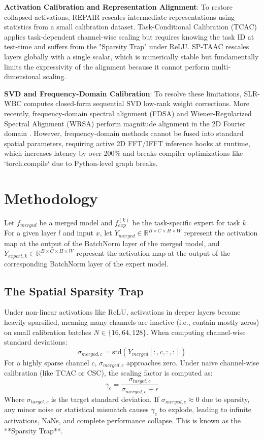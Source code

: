 \documentclass{article}
\theoremstyle{plain}
\theoremstyle{definition}
\theoremstyle{remark}
\begin{document}
\textbf{Activation Calibration and Representation Alignment}: To restore collapsed activations, REPAIR \citep{Jordan2023} rescales intermediate representations using statistics from a small calibration dataset. Task-Conditional Calibration (TCAC) applies task-dependent channel-wise scaling but requires knowing the task ID at test-time and suffers from the "Sparsity Trap" under ReLU. SP-TAAC rescales layers globally with a single scalar, which is numerically stable but fundamentally limits the expressivity of the alignment because it cannot perform multi-dimensional scaling.

\textbf{SVD and Frequency-Domain Calibration}: To resolve these limitations, SLR-WBC \citep{Anonymous2026} computes closed-form sequential SVD low-rank weight corrections. More recently, frequency-domain spectral alignment (FDSA) and Wiener-Regularized Spectral Alignment (WRSA) perform magnitude alignment in the 2D Fourier domain \citep{Anonymous2025}. However, frequency-domain methods cannot be fused into standard spatial parameters, requiring active 2D FFT/IFFT inference hooks at runtime, which increases latency by over 200\% and breaks compiler optimizations like `torch.compile` due to Python-level graph breaks.

\section{Methodology}
\label{sec:method}
Let $f_{merged}$ be a merged model and $f_{exp}^{(k)}$ be the task-specific expert for task $k$. For a given layer $l$ and input $x$, let $Y_{merged} \in \mathbb{R}^{B \times C \times H \times W}$ represent the activation map at the output of the BatchNorm layer of the merged model, and $Y_{expert, k} \in \mathbb{R}^{B \times C \times H \times W}$ represent the activation map at the output of the corresponding BatchNorm layer of the expert model.

\subsection{The Spatial Sparsity Trap}
Under non-linear activations like ReLU, activations in deeper layers become heavily sparsified, meaning many channels are inactive (i.e., contain mostly zeros) on small calibration batches $N \in \{16, 64, 128\}$. When computing channel-wise standard deviations:
\begin{equation}
\sigma_{merged, c} = \text{std}(Y_{merged}[:, c, :, :])
\end{equation}
For a highly sparse channel $c$, $\sigma_{merged, c}$ approaches zero. Under naive channel-wise calibration (like TCAC or CSC), the scaling factor is computed as:
\begin{equation}
\gamma_{c} = \frac{\sigma_{target, c}}{\sigma_{merged, c} + \epsilon}
\end{equation}
Where $\sigma_{target, c}$ is the target standard deviation. If $\sigma_{merged, c} \approx 0$ due to sparsity, any minor noise or statistical mismatch causes $\gamma_c$ to explode, leading to infinite activations, NaNs, and complete performance collapse. This is known as the **Sparsity Trap**.
\end{document}
